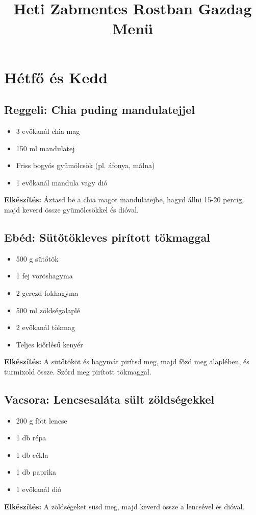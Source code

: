 \documentclass[a4paper,12pt]{article}
\title{\Huge Heti Zabmentes Rostban Gazdag Menü}
\author{}
\date{}
\begin{document}
\maketitle
\tableofcontents
\newpage

\section{Hétfő és Kedd}
\subsection{Reggeli: Chia puding mandulatejjel}
\begin{itemize}
    \item 3 evőkanál chia mag
    \item 150 ml mandulatej
    \item Friss bogyós gyümölcsök (pl. áfonya, málna)
    \item 1 evőkanál mandula vagy dió
\end{itemize}
\textbf{Elkészítés:} Áztasd be a chia magot mandulatejbe, hagyd állni 15-20 percig, majd keverd össze gyümölcsökkel és dióval.

\subsection{Ebéd: Sütőtökleves pirított tökmaggal}
\begin{itemize}
    \item 500 g sütőtök
    \item 1 fej vöröshagyma
    \item 2 gerezd fokhagyma
    \item 500 ml zöldségalaplé
    \item 2 evőkanál tökmag
    \item Teljes kiőrlésű kenyér
\end{itemize}
\textbf{Elkészítés:} A sütőtököt és hagymát pirítsd meg, majd főzd meg alaplében, és turmixold össze. Szórd meg pirított tökmaggal.

\subsection{Vacsora: Lencsesaláta sült zöldségekkel}
\begin{itemize}
    \item 200 g főtt lencse
    \item 1 db répa
    \item 1 db cékla
    \item 1 db paprika
    \item 1 evőkanál dió
\end{itemize}
\textbf{Elkészítés:} A zöldségeket süsd meg, majd keverd össze a lencsével és dióval.
\end{document}
